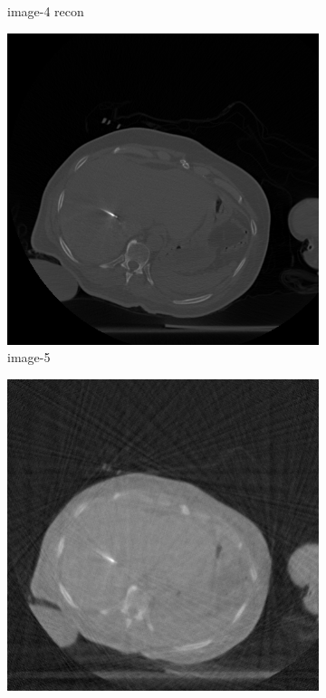 \documentclass[journal]{IEEEtran}
\begin{document}
\begin{figure}[!h]
\begin{subfigure}[b]{0.24\linewidth}
\captionsetup{labelformat=empty}       
 \caption{image-4 recon}
    \end{subfigure}
 \begin{subfigure}[b]{0.24\linewidth}
        \includegraphics[width=\textwidth]{../images/tmh/RFA2/template5.png}
\captionsetup{labelformat=empty}       
 \caption{image-5}
    \end{subfigure}
       \begin{subfigure}[b]{0.24\linewidth}
        \includegraphics[width=\textwidth]{../images/tmh/RFA2/new_protocol/result_image_5.png}

\end{subfigure}
\end{figure}
\end{document}

